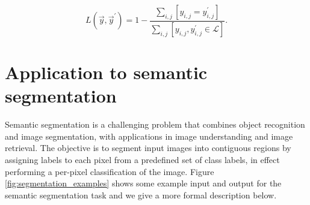 \begin{equation}
L(\vec{y}, \vec{y}^\prime) = 1 - \frac{\sum_{i,j} \left [ y_{i,j} = y^\prime_{i,j}\right]}{\sum_{i,j} \left [y_{i,j}, y^\prime_{i,j} \in \mathcal{L}\right ]}.
\label{eq:patch_loss}
\end{equation}



\section{Application to semantic segmentation}





Semantic segmentation is a challenging problem that combines object recognition and image segmentation, with applications in image understanding and image retrieval. The objective is to segment input images into contiguous regions by assigning labels to each pixel from a predefined set of class labels, in effect performing a per-pixel classification of the image. Figure \ref{fig:segmentation_examples} shows some example input and output for the semantic segmentation task and we give a more formal description below.



